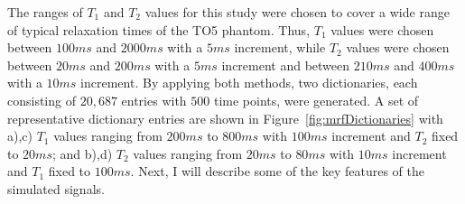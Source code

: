 \hfill

The ranges of $T_1$ and $T_2$ values for this study were chosen to cover a wide range of typical relaxation times of the TO5 phantom.
Thus, $T_1$ values were chosen between $100ms$ and $2000ms$ with a $5ms$ increment, while
$T_2$ values were chosen between $20ms$ and $200ms$ with a $5ms$ increment and between $210ms$ and $400ms$ with a $10ms$ increment.
By applying both methods, two dictionaries, each consisting of $20,687$ entries with $500$ time points, were generated.
A set of representative dictionary entries are shown in Figure~\ref{fig:mrfDictionaries} with a),c) $T_1$ values ranging from $200ms$ to $800ms$ with $100ms$ increment and $T_2$ fixed to $20ms$; and b),d) $T_2$ values ranging from $20ms$ to $80ms$ with $10ms$ increment and $T_1$ fixed to $100ms$.
Next, I will describe some of the key features of the simulated signals.

